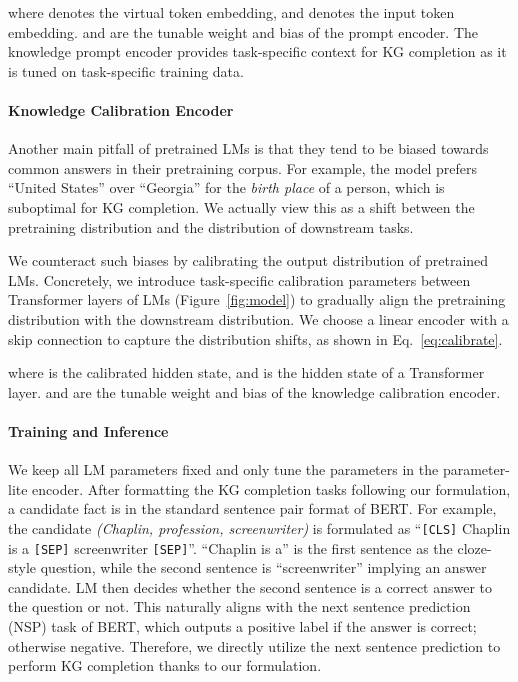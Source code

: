 \documentclass[11pt]{article}
\newcommand{\calibration}{knowledge calibration encoder}
\newcommand{\texthrt}[1]{\textsl{#1}}
\newcommand{\textspt}[1]{\texttt{#1}}
\begin{document}
where  denotes the virtual token embedding, and  denotes the input token embedding.  and  are the tunable weight and bias of the prompt encoder. The knowledge prompt encoder provides task-specific context for KG completion as it is tuned on task-specific training data. 

\paragraph{Knowledge Calibration Encoder} Another main pitfall of pretrained LMs is that they tend to be biased towards common answers in their pretraining corpus. For example, the model prefers ``United States'' over ``Georgia'' for the \texthrt{birth place} of a person, which is suboptimal for KG completion. We actually view this as a shift between the pretraining distribution and the distribution of downstream tasks. 

We counteract such biases by calibrating the output distribution of pretrained LMs. Concretely, we introduce task-specific calibration parameters between Transformer layers of LMs (Figure~\ref{fig:model}) to gradually align the pretraining distribution with the downstream distribution. We choose a linear encoder with a skip connection to capture the distribution shifts, as shown in Eq.~\ref{eq:calibrate}.

where  is the calibrated hidden state, and  is the hidden state of a Transformer layer.  and  are the tunable weight and bias of the \calibration.

\paragraph{Training and Inference} We keep all LM parameters fixed and only tune the parameters in the parameter-lite encoder. After formatting the KG completion tasks following our formulation, a candidate fact is in the standard sentence pair format of BERT. For example, the candidate \texthrt{(Chaplin, profession, screenwriter)} is formulated as ``\textspt{[CLS]} Chaplin is a \textspt{[SEP]} screenwriter \textspt{[SEP]}''. ``Chaplin is a'' is the first sentence as the cloze-style question, while the second sentence is ``screenwriter'' implying an answer candidate. LM then decides whether the second sentence is a correct answer to the question or not. This naturally aligns with the next sentence prediction (NSP) task of BERT, which outputs a positive label if the answer is correct; otherwise negative. Therefore, we directly utilize the next sentence prediction to perform KG completion thanks to our formulation. 
\end{document}
